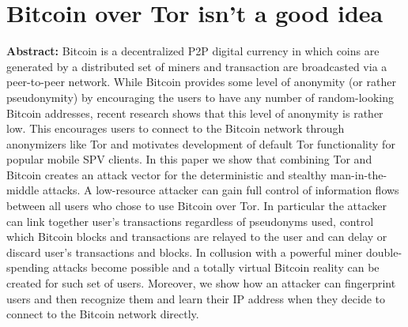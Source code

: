 \section{Bitcoin over Tor isn't a good idea}

\textbf{Abstract:} 
Bitcoin is a decentralized P2P digital currency in which coins are generated by a distributed set of miners and transaction are broadcasted via a peer-to-peer network. While Bitcoin provides some level of anonymity (or rather pseudonymity) by encouraging the users to have any number of random-looking Bitcoin addresses, recent research shows that this level of anonymity is rather low. This encourages users to connect to the Bitcoin network through anonymizers like Tor and motivates development of default Tor functionality for popular mobile SPV clients. In this paper we show that combining Tor and Bitcoin creates an attack vector for the deterministic and stealthy man-in-the-middle attacks. A low-resource attacker can gain full control of information flows between all users who chose to use Bitcoin over Tor. In particular the attacker can link together user’s transactions regardless of pseudonyms used, control which Bitcoin blocks and transactions are relayed to the user and can delay or discard user’s transactions and blocks. In collusion with a powerful miner double-spending attacks become possible and a totally virtual Bitcoin reality can be created  for such set of users. Moreover, we show how an attacker can fingerprint users and then recognize them and learn their IP address when they decide to connect to the Bitcoin network directly.
